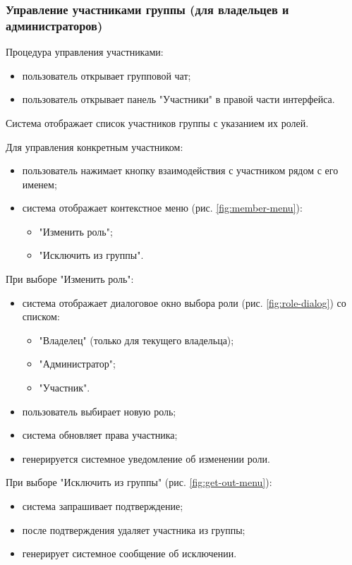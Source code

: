\subsubsection{Управление участниками группы (для владельцев и администраторов)}
Процедура управления участниками:
\begin{itemize}
	\item пользователь открывает групповой чат;
	\item пользователь открывает панель "Участники" в правой части интерфейса.
\end{itemize}

Система отображает список участников группы с указанием их ролей.

Для управления конкретным участником:
\begin{itemize}
	\item пользователь нажимает кнопку взаимодействия с участником рядом с его именем;
	\item система отображает контекстное меню (рис. \ref{fig:member-menu}):
	\begin{itemize}
		\item "Изменить роль";
		\item "Исключить из группы".
	\end{itemize}
\end{itemize}

При выборе "Изменить роль":
\begin{itemize}
	\item система отображает диалоговое окно выбора роли (рис. \ref{fig:role-dialog}) со списком:
	\begin{itemize}
		\item "Владелец" (только для текущего владельца);
		\item "Администратор";
		\item "Участник".
	\end{itemize}
	\item пользователь выбирает новую роль;
	\item система обновляет права участника;
	\item генерируется системное уведомление об изменении роли.
\end{itemize}

При выборе "Исключить из группы" (рис. \ref{fig:get-out-menu}):
\begin{itemize}
	\item система запрашивает подтверждение;
	\item после подтверждения удаляет участника из группы;
	\item генерирует системное сообщение об исключении.
\end{itemize}

